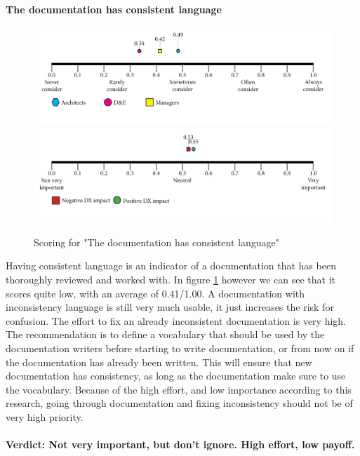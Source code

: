 \documentclass{article}
\begin{document}
\paragraph{The documentation has consistent language}
\begin{figure}[H]
\centering
\includegraphics[width=\linewidth]{scorelines/aspect6.png}
\includegraphics[width=\linewidth]{dxscorelines/dxaspect6.png}
\caption{Scoring for "The documentation has consistent language"}
\label{fig:aspect6}
\end{figure}
Having consistent language is an indicator of a documentation that has been thoroughly reviewed and worked with. In figure \ref{fig:aspect6} however we can see that it scores quite low, with an average of 0.41/1.00. A documentation with inconsistency language is still very much usable, it just increases the risk for confusion. The effort to fix an already inconsistent documentation is very high. The recommendation is to define a vocabulary that should be used by the documentation writers before starting to write documentation, or from now on if the documentation has already been written. This will ensure that new documentation has consistency, as long as the documentation make sure to use the vocabulary. Because of the high effort, and low importance according to this research, going through documentation and fixing inconsistency should not be of very high priority.\\ \\
\textbf{Verdict: Not very important, but don't ignore. High effort, low payoff.}
\end{document}
